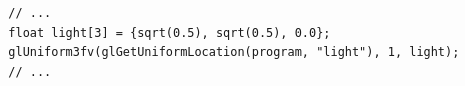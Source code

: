 \documentclass[calcdimensions,landscape,letterpaper]{powersem}
\newcommand{\thecurrentheading}{}
\newcommand{\heading}[1]{\renewcommand{\thecurrentheading}{#1}}
\begin{document}
\begin{slide}
    \heading{Diffuse Lightning: Initialise Light Vector}
    \begin{center}
        \begin{minipage}[c]{\textwidth}
            \begin{verbatim}
  // ...
  float light[3] = {sqrt(0.5), sqrt(0.5), 0.0};
  glUniform3fv(glGetUniformLocation(program, "light"), 1, light);
  // ...
            \end{verbatim}
        \end{minipage}
    \end{center}
\end{slide}

\begin{slide}
    \heading{Diffuse Lighting: Result}
    \begin{center}
    \end{center}
\end{slide}
\end{document}
